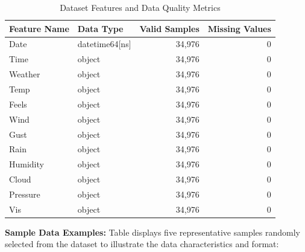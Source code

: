 \begin{table}[H]
    \centering
    \begin{tabular}{|l|l|r|r|}
    \hline
    \textbf{Feature Name} & \textbf{Data Type} & \textbf{Valid Samples} & \textbf{Missing Values} \\
    \hline
    Date & datetime64[ns] & 34,976 & 0 \\
    Time & object & 34,976 & 0 \\
    Weather & object & 34,976 & 0 \\
    Temp & object & 34,976 & 0 \\
    Feels & object & 34,976 & 0 \\
    Wind & object & 34,976 & 0 \\
    Gust & object & 34,976 & 0 \\
    Rain & object & 34,976 & 0 \\
    Humidity & object & 34,976 & 0 \\
    Cloud & object & 34,976 & 0 \\
    Pressure & object & 34,976 & 0 \\
    Vis & object & 34,976 & 0 \\
    \hline
    \end{tabular}
    \caption{Dataset Features and Data Quality Metrics}
    \label{tab:features}
\end{table}

\noindent\textbf{Sample Data Examples:} Table displays five representative samples randomly selected from the dataset to illustrate the data characteristics and format:

\begin{table}[H]
    \centering
    \caption{Representative Dataset Samples}
    \label{tab:samples}
\end{table}

